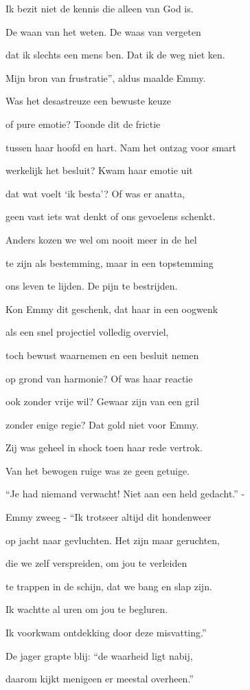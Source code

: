 Ik bezit niet de kennis
die alleen van God is.

De waan van het weten.
De waas van vergeten

dat ik slechts een mens ben.
Dat ik de weg niet ken.

Mijn bron van frustratie”,
aldus maalde Emmy.

Was het desastreuze
een bewuste keuze

of pure emotie?
Toonde dit de frictie

tussen haar hoofd en hart.
Nam het ontzag voor smart

werkelijk het besluit?
Kwam haar emotie uit

dat wat voelt ‘ik besta’?
Of was er anatta,

geen vast iets wat denkt
of ons gevoelens schenkt.

Anders kozen we wel
om nooit meer in de hel

te zijn als bestemming,
maar in een topstemming

ons leven te lijden.
De pijn te bestrijden.

Kon Emmy dit geschenk,
dat haar in een oogwenk

als een snel projectiel
volledig overviel,

toch bewust waarnemen
en een besluit nemen

op grond van harmonie?
Of was haar reactie

ook zonder vrije wil?
Gewaar zijn van een gril

zonder enige regie?
Dat gold niet voor Emmy.

Zij was geheel in shock
toen haar rede vertrok.

Van het bewogen ruige
was ze geen getuige.

“Je had niemand verwacht!
Niet aan een held gedacht.” -

Emmy zweeg - “Ik trotseer
altijd dit hondenweer

op jacht naar gevluchten.
Het zijn maar geruchten,

die we zelf verspreiden,
om jou te verleiden

te trappen in de schijn,
dat we bang en slap zijn.

Ik wachtte al uren
om jou te begluren.

Ik voorkwam ontdekking
door deze misvatting.”

De jager grapte blij:
“de waarheid ligt nabij,

daarom kijkt menigeen
er meestal overheen.”

